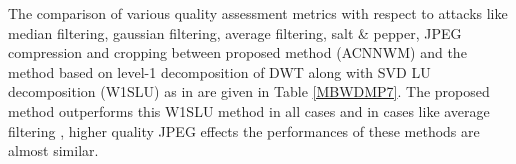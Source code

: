 The comparison of various quality assessment metrics with respect to attacks like median filtering, gaussian filtering, average filtering, salt \& pepper, JPEG compression and cropping between proposed method (ACNNWM) and the method based on level-1 decomposition of DWT along with SVD LU decomposition (W1SLU) as in \cite{P7} are given in Table \ref{MBWDMP7}. The proposed method outperforms this W1SLU method in all cases and in cases like average filtering , higher quality JPEG effects the performances of these methods are almost similar.\\


\begin{table*}
\caption{Comparison with W1SLU Method as in \cite{P7} }
\smallskip\noindent
{}
\end{table*}


